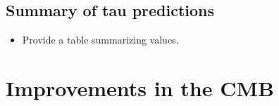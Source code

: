 \documentclass[twocolumn,aps,prd,nofootinbib,showpacs]{revtex4-1}
\begin{document}
\subsection{Summary of tau predictions}
\begin{itemize}
\item Provide a table summarizing values.
\end{itemize}

\section{Improvements in the CMB}
\end{document}
